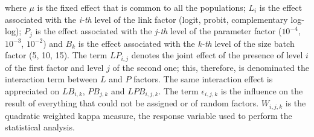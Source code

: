\documentclass[10pt, a4paper, titlepage]{article}
\begin{document}
\begin{multicols}{2}
	where $\mu$ is the fixed effect that is common to all the populations; $L_i$ is the effect associated with the \textit{i-th} level of the link factor (logit, probit, complementary log-log); $P_j$ is the effect associated with the \textit{j-th} level of the parameter factor ($10^{-4}$, $10^{-3}$, $10^{-2}$) and $B_k$ is the effect associated with the \textit{k-th} level of the size batch factor (5, 10, 15). The term $LP_{i,j}$ denotes the joint effect of the presence of level $i$ of the first factor and level $j$ of the second one; this, therefore, is denominated the interaction term between $L$ and $P$ factors. The same interaction effect is appreciated on $LB_{i,k}$, $PB_{j,k}$ and $LPB_{i,j,k}$. The term $\epsilon_{i,j,k}$ is the influence on the result of everything that could not be assigned or of random factors. $W_{i,j,k}$ is the quadratic weighted kappa measure, the response variable used to perform the statistical analysis.
	
	\printbibliography
	
	\end{multicols}
\end{document}
